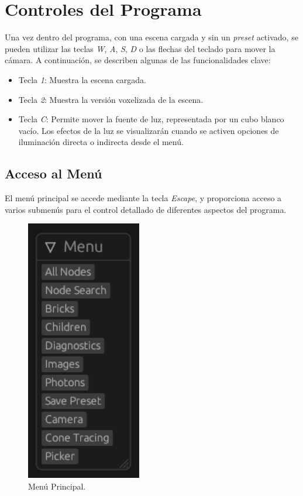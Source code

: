 \section{Controles del Programa}

Una vez dentro del programa, con una escena cargada y sin un \textit{preset} activado, se pueden utilizar las teclas \textit{W}, \textit{A}, \textit{S}, \textit{D} o las flechas del teclado para mover la cámara. A continuación, se describen algunas de las funcionalidades clave:

\begin{itemize}
    \item Tecla \textit{1}: Muestra la escena cargada.
    \item Tecla \textit{2}: Muestra la versión voxelizada de la escena.
    \item Tecla \textit{C}: Permite mover la fuente de luz, representada por un cubo blanco vacío. Los efectos de la luz se visualizarán cuando se activen opciones de iluminación directa o indirecta desde el menú.
\end{itemize}

\subsection{Acceso al Menú}

El menú principal se accede mediante la tecla \textit{Escape}, y proporciona acceso a varios submenús para el control detallado de diferentes aspectos del programa.

\begin{figure}[h]
    \centering
    \includegraphics[width=.5\textwidth]{menu.png}
    \caption{Menú Principal.}
    \label{fig:menu}
\end{figure}

